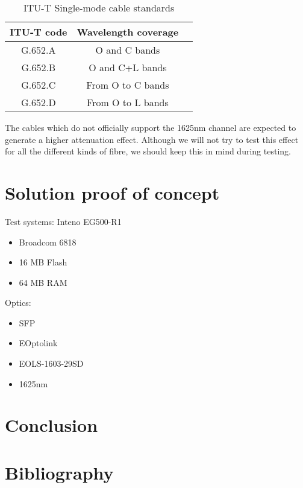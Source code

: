 \documentclass{article}
\begin{document}
\begin{table}[h]
\centering
\label{tab:single-mode_types}
\caption{ITU-T Single-mode cable standards}
\begin{tabular}{|c|c|c|}
\hline 
ITU-T code & Wavelength coverage\\ 
\hline 
G.652.A & O and C bands \\ 
\hline
G.652.B & O and C+L bands \\
\hline
G.652.C & From O to C bands \\
\hline
G.652.D & From O to L bands \\
\hline
\end{tabular} 
\end{table}

The cables which do not officially support the 1625nm channel are expected to generate a higher attenuation effect. Although we will not try to test this effect for all the different kinds of fibre, we should keep this in mind during testing.

\section{Solution proof of concept}
Test systems: Inteno EG500-R1 \cite{Inteno:EG500}
\begin{itemize}
\item Broadcom 6818
\item 16 MB Flash
\item 64 MB RAM
\end{itemize}

Optics:
\begin{itemize}
\item SFP
\item EOptolink
\item EOLS-1603-29SD
\item 1625nm
\end{itemize}

\section{Conclusion}

\section{Bibliography}


\end{document}
